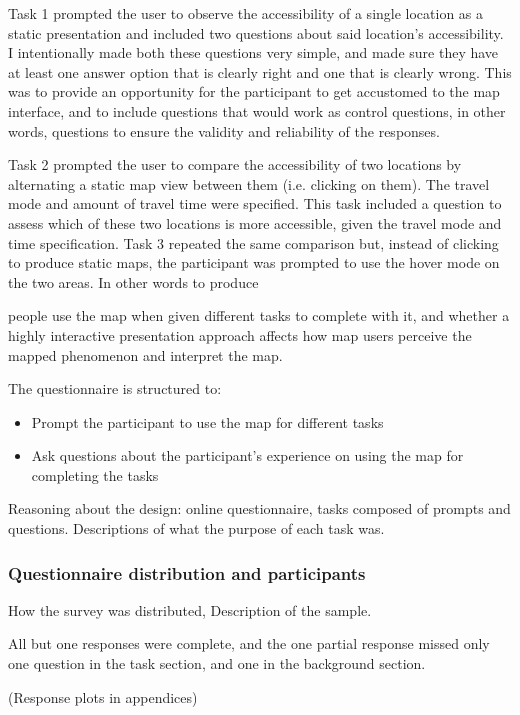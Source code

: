 Task 1 prompted the user to observe the accessibility of a single location
as a static presentation
and included two questions about said location's accessibility.
I intentionally made both these questions very simple,
and made sure they have at least one answer option that is clearly right
and one that is clearly wrong.
This was to provide an opportunity for the participant to get accustomed to the map interface,
and to include questions that would work as control questions,
in other words, questions to ensure the validity and reliability of the responses.

Task 2 prompted the user to compare the accessibility of two locations by alternating
a static map view between them (i.e. clicking on them).
The travel mode and amount of travel time were specified.
This task included a question to assess which of these two locations is more accessible,
given the travel mode and time specification.
Task 3 repeated the same comparison but, instead of clicking to produce static maps,
the participant was prompted to use the hover mode on the two areas.
In other words to produce

people use the map when given different tasks to complete with it,
and whether a highly interactive presentation approach affects
how map users perceive the mapped phenomenon and interpret the map.

The questionnaire is structured to:
\begin{itemize}
	\item Prompt the participant to use the map for different tasks
	\item Ask questions about the participant's experience
	on using the map for completing the tasks
\end{itemize}

Reasoning about the design: online questionnaire, tasks composed of prompts and questions.
Descriptions of what the purpose of each task was.

\subsubsection{Questionnaire distribution and participants}
How the survey was distributed,
Description of the sample.

All but one responses were complete, and the one partial response missed only one question
in the task section, and one in the background section.

(Response plots in appendices)

